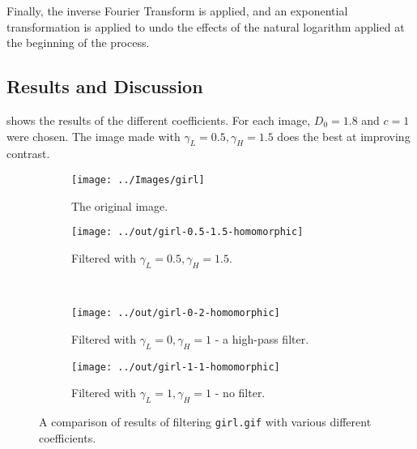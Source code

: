 \documentclass[headings=optiontoheadandtoc,listof=totoc,parskip=full]{scrartcl}
\begin{document}
Finally, the inverse Fourier Transform is applied, and an exponential transformation is applied to undo the effects of the natural logarithm applied at the beginning of the process.

\subsection{Results and Discussion}

 shows the results of the different coefficients. For each image, $D_0 = 1.8$ and $c = 1$ were chosen. The image made with $\gamma_L = 0.5, \gamma_H = 1.5$ does the best at improving contrast.

\begin{figure}[H]
	\centering
	\begin{subfigure}[t]{.4\textwidth}
		\centering
		\texttt{[image: ../Images/girl]}
		\caption{The original image.}
	\end{subfigure}
	\quad
	\begin{subfigure}[t]{.4\textwidth}
		\centering
		\texttt{[image: ../out/girl-0.5-1.5-homomorphic]}
		\caption{Filtered with $\gamma_L = 0.5, \gamma_H = 1.5$.}
	\end{subfigure}
	\\
	\begin{subfigure}[t]{.4\textwidth}
		\centering
		\texttt{[image: ../out/girl-0-2-homomorphic]}
		\caption{Filtered with $\gamma_L = 0, \gamma_H = 1$ - a high-pass filter.}
	\end{subfigure}
	\quad
	\begin{subfigure}[t]{.4\textwidth}
		\centering
		\texttt{[image: ../out/girl-1-1-homomorphic]}
		\caption{Filtered with $\gamma_L = 1, \gamma_H = 1$ - no filter.}
	\end{subfigure}
	\caption{A comparison of results of filtering \texttt{girl.gif} with various different coefficients.}
	\label{fig:homo-comparison}
\end{figure}
\end{document}
